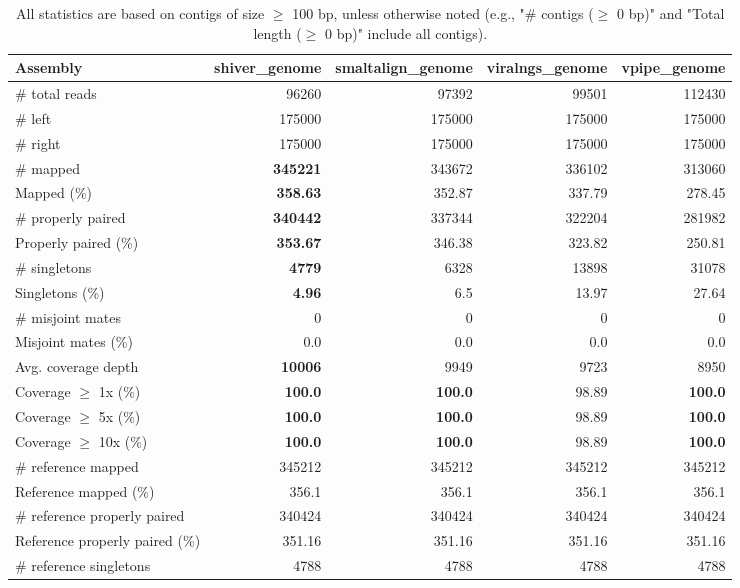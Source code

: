\documentclass[12pt,a4paper]{article}
\begin{document}
\begin{table}[ht]
\begin{center}
\caption{All statistics are based on contigs of size $\geq$ 100 bp, unless otherwise noted (e.g., "\# contigs ($\geq$ 0 bp)" and "Total length ($\geq$ 0 bp)" include all contigs).}
\begin{tabular}{|l*{4}{|r}|}
\hline
Assembly & shiver\_genome & smaltalign\_genome & viralngs\_genome & vpipe\_genome \\ \hline
\# total reads & 96260 & 97392 & 99501 & 112430 \\ \hline
\# left & 175000 & 175000 & 175000 & 175000 \\ \hline
\# right & 175000 & 175000 & 175000 & 175000 \\ \hline
\# mapped & {\bf 345221} & 343672 & 336102 & 313060 \\ \hline
Mapped (\%) & {\bf 358.63} & 352.87 & 337.79 & 278.45 \\ \hline
\# properly paired & {\bf 340442} & 337344 & 322204 & 281982 \\ \hline
Properly paired (\%) & {\bf 353.67} & 346.38 & 323.82 & 250.81 \\ \hline
\# singletons & {\bf 4779} & 6328 & 13898 & 31078 \\ \hline
Singletons (\%) & {\bf 4.96} & 6.5 & 13.97 & 27.64 \\ \hline
\# misjoint mates & 0 & 0 & 0 & 0 \\ \hline
Misjoint mates (\%) & 0.0 & 0.0 & 0.0 & 0.0 \\ \hline
Avg. coverage depth & {\bf 10006} & 9949 & 9723 & 8950 \\ \hline
Coverage $\geq$ 1x (\%) & {\bf 100.0} & {\bf 100.0} & 98.89 & {\bf 100.0} \\ \hline
Coverage $\geq$ 5x (\%) & {\bf 100.0} & {\bf 100.0} & 98.89 & {\bf 100.0} \\ \hline
Coverage $\geq$ 10x (\%) & {\bf 100.0} & {\bf 100.0} & 98.89 & {\bf 100.0} \\ \hline
\# reference mapped & 345212 & 345212 & 345212 & 345212 \\ \hline
Reference mapped (\%) & 356.1 & 356.1 & 356.1 & 356.1 \\ \hline
\# reference properly paired & 340424 & 340424 & 340424 & 340424 \\ \hline
Reference properly paired (\%) & 351.16 & 351.16 & 351.16 & 351.16 \\ \hline
\# reference singletons & 4788 & 4788 & 4788 & 4788 \\ \hline

\end{tabular}
\end{center}
\end{table}
\end{document}
